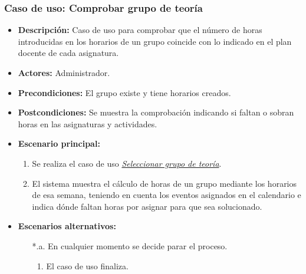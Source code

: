 \documentclass{book}
\begin{document}
\subsubsection*{Caso de uso: Comprobar grupo de teoría}
\begin{itemize}
\item{\bf Descripción:} Caso de uso para comprobar que el número de horas introducidas en los horarios de un grupo coincide con lo indicado en el plan docente de cada asignatura.
\item{\bf Actores:} Administrador.
\item{\bf Precondiciones:} El grupo existe y tiene horarios creados.
\item{\bf Postcondiciones:} Se muestra la comprobación indicando si faltan o sobran horas en las asignaturas y actividades.
\item{\bf Escenario principal:}
	\begin{enumerate}
	\item Se realiza el caso de uso {\em \hyperref[select_grupo]{Seleccionar grupo de teoría}}.
	\item El sistema muestra el cálculo de horas de un grupo mediante los horarios de esa semana, teniendo en cuenta los eventos asignados en el calendario e indica dónde faltan horas por asignar para que sea solucionado.
	\end{enumerate}
\item{\bf Escenarios alternativos:}
	\begin{itemize}
		\item[*.a.] En cualquier momento se decide parar el proceso.
		\begin{enumerate}
			\item El caso de uso finaliza.
		\end{enumerate}
	\end{itemize}
\end{itemize}
\end{document}
